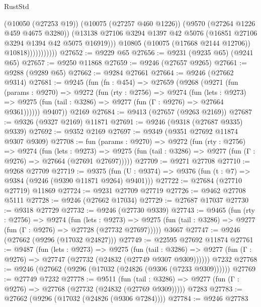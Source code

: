 \begin{lexlean}{RustStd}
\begin{coremodule}
                            (@10050 (@27253 @19))
                            (@10075 (@27257 @460 @1226))
                            (@9570 (@27264 @1226 @459 @4675 @3280))
                            (@13138
                              @27106
                              @3294
                              @1397
                              @42
                              @5076
                              (@16851 @27106 @3294 @1394 @42 @5075 @16919)))
                          @10805
                          (@10075 (@17668 @2144 @12706))
                          @10818)))))))))))
@27652 := @9229 @65
@27656 := @9231 (@9235 @65) (@9241 @65)
@27657 := @9250 @11868
@27659 := @9246 (@27657 @9265)
@27661 := @9288 (@9289 @65)
@27662 := @9284 @27661
@27664 := @9246 (@27662 @9314)
@27681 := @9245
    (fun (fn : @454) =>
    @27659
      (@9268
        (@9271
          (fun (params : @9270) =>
          @9272
            (fun (rty : @2756) =>
            @9274
              (fun (lets : @9273) =>
              @9275 (fun (tail : @3286) => @9277 (fun (Γ : @9276) => @27664 @9361))))))
        @9407))
    @2169
@27684 := @9413 (@27657 (@9263 @2169))
@27687 := @9326 (@9327 @2169) @11871
@27691 := @9246 (@9318 (@27687 @9335) @9339)
@27692 := @9352 @2169
@27697 := @9349 (@9351 @27692 @11874 @9307 @9309)
@27708 := fun (params : @9270) =>
  @9272
    (fun (rty : @2756) =>
    @9274
      (fun (lets : @9273) =>
      @9275 (fun (tail : @3286) => @9277 (fun (Γ : @9276) => @27664 (@27691 @27697)))))
@27709 := @9271 @27708
@27710 := @9268 @27709
@27719 := @9375
    (fun (U : @9374) => @9376 (fun (t : @7) => @9384 (@9246 (@9390 @11871 @9264) @9401)))
@27722 := @27684 (@27710 @27719) @11869
@27724 := @9231 @27709 @27719
@27726 := @9462 @27708 @5111
@27728 := @9246 (@27662 @17034)
@27729 := @27687 @17037
@27730 := @9318 @27729
@27732 := @9246 (@27730 @9339)
@27743 := @9465
    (fun (rty : @2756) =>
    @9274
      (fun (lets : @9273) =>
      @9275 (fun (tail : @3286) => @9277 (fun (Γ : @9276) => @27728 (@27732 @27697)))))
    @3667
@27747 := @9246 (@27662 (@9296 (@17032 @24827)))
@27749 := @22595 @27692 @11874
@27761 := @9487
    (fun (lets : @9273) =>
    @9275
      (fun (tail : @3286) =>
      @9277 (fun (Γ : @9276) => @27747 (@27732 (@24832 (@27749 @9307 @9309))))))
    @7232
@27768 := @9246 (@27662 (@9296 (@17032 (@24826 (@9306 (@7233 @9309))))))
@27769 := @27749 @7232
@27778 := @9511
    (fun (tail : @3286) => @9277 (fun (Γ : @9276) => @27768 (@27732 (@24832 (@27769 @9309)))))
    @7283
@27783 := @27662 (@9296 (@17032 (@24826 (@9306 @7284))))
@27784 := @9246 @27783

\end{coremodule}
\end{lexlean}
